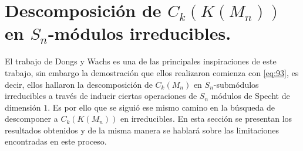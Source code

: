 \documentclass[12pt]{book}
\theoremstyle{definition}
\newcounter{in}
\begin{document}
\chapter{Descomposición de $C_{k}(K(M_n))$ en $S_{n}$-módulos irreducibles.}
\label{Des_esp_cad}
El trabajo de  Dongs y Wachs \cite{dong2002combinatorial} es una de las principales inspiraciones de este trabajo, sin embargo la demostración que ellos realizaron comienza con \ref{eq:93}, es decir, ellos hallaron la descomposición de $C_{k}(M_{n})$ en $S_{n}$-submódulos irreducibles a través de inducir ciertas operaciones de $S_{n}$ módulos de Specht de dimensión $1$. Es por ello que se siguió ese mismo camino en la búsqueda de descomponer a $C_{k}(K(M_{n}))$ en irreducibles. En esta sección se presentan los resultados obtenidos y de la misma manera se hablará sobre las limitaciones encontradas en este proceso.
\end{document}
